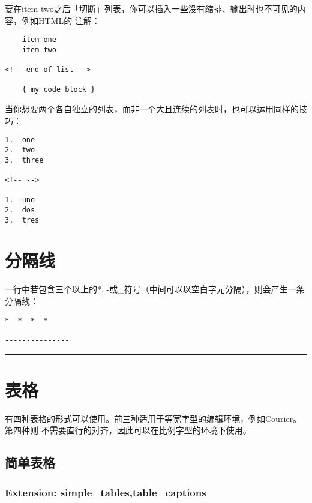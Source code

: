\documentclass[fancyhdr,bookmark]{ctexbook}
\begin{document}
要在item
two之后「切断」列表，你可以插入一些没有缩排、输出时也不可见的内容，例如HTML的
注解：

\begin{lstlisting}
-   item one
-   item two

<!-- end of list -->

    { my code block }
\end{lstlisting}

当你想要两个各自独立的列表，而非一个大且连续的列表时，也可以运用同样的技巧：

\begin{lstlisting}
1.  one
2.  two
3.  three

<!-- -->

1.  uno
2.  dos
3.  tres
\end{lstlisting}

\section{分隔线}\label{ux5206ux9694ux7ebf}

一行中若包含三个以上的*,
-或\_符号（中间可以以空白字元分隔），则会产生一条分隔线：

\begin{lstlisting}
*  *  *  *

---------------
\end{lstlisting}

\begin{center}\rule{0.5\linewidth}{\linethickness}\end{center}

\section{表格}\label{ux8868ux683c}

有四种表格的形式可以使用。前三种适用于等宽字型的编辑环境，例如Courier。第四种则
不需要直行的对齐，因此可以在比例字型的环境下使用。

\subsection{简单表格}\label{ux7b80ux5355ux8868ux683c}

\subsubsection{Extension:
simple\_tables,table\_captions}\label{extension-simple_tablestable_captions}
\end{document}
